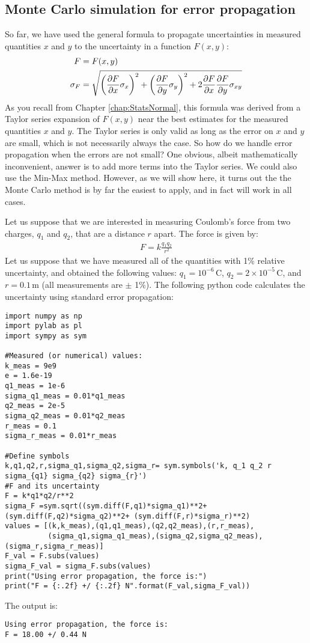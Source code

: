 \subsection{Monte Carlo simulation for error propagation}
So far, we have used the general formula to propagate uncertainties in measured quantities $x$ and $y$ to the uncertainty in a function $F(x,y)$:
\begin{align}
F&=F(x,y)\nonumber\\
\sigma_{F} &= \sqrt{\left(\frac{\partial F}{\partial x}\sigma_x\right)^2 + \left(\frac{\partial F}{\partial y} \sigma_y\right)^2+2\frac{\partial F}{\partial x}\frac{\partial F}{\partial y}\sigma_{xy}}
\end{align}
As you recall from Chapter \ref{chap:StatsNormal}, this formula was derived from a Taylor series expansion of $F(x,y)$ near the best estimates for the measured quantities $x$ and $y$. The Taylor series is only valid as long as the error on $x$ and $y$ are small, which is not necessarily always the case. So how do we handle error propagation when the errors are not small? One obvious, albeit mathematically inconvenient, answer is to add more terms into the Taylor series. We could also use the Min-Max method. However, as we will show here, it turns out the the Monte Carlo method is by far the easiest to apply, and in fact will work in all cases.

Let us suppose that we are interested in measuring Coulomb's force from two charges, $q_1$ and $q_2$, that are a distance $r$ apart. The force is given by:
\begin{align*}
F = k\frac{q_1q_2}{r^2}
\end{align*}
Let us suppose that we have measured all of the quantities with 1\% relative uncertainty, and obtained the following values: $q_1 =10^{-6}$\,C, $q_2 =2\times10^{-5}$\,C, and $r=0.1$\,m (all measurements are $\pm$ 1\%). The following python code calculates the uncertainty using standard error propagation:
\begin{lstlisting}[frame=single] 
import numpy as np
import pylab as pl
import sympy as sym

#Measured (or numerical) values:
k_meas = 9e9
e = 1.6e-19
q1_meas = 1e-6
sigma_q1_meas = 0.01*q1_meas
q2_meas = 2e-5
sigma_q2_meas = 0.01*q2_meas
r_meas = 0.1
sigma_r_meas = 0.01*r_meas

#Define symbols
k,q1,q2,r,sigma_q1,sigma_q2,sigma_r= sym.symbols('k, q_1 q_2 r sigma_{q1} sigma_{q2} sigma_{r}')
#F and its uncertainty
F = k*q1*q2/r**2
sigma_F =sym.sqrt((sym.diff(F,q1)*sigma_q1)**2+ (sym.diff(F,q2)*sigma_q2)**2+ (sym.diff(F,r)*sigma_r)**2)
values = [(k,k_meas),(q1,q1_meas),(q2,q2_meas),(r,r_meas),
          (sigma_q1,sigma_q1_meas),(sigma_q2,sigma_q2_meas),(sigma_r,sigma_r_meas)]
F_val = F.subs(values)
sigma_F_val = sigma_F.subs(values)
print("Using error propagation, the force is:")
print("F = {:.2f} +/ {:.2f} N".format(F_val,sigma_F_val))

\end{lstlisting}
The output is:
\begin{verbatim}
Using error propagation, the force is:
F = 18.00 +/ 0.44 N
\end{verbatim}

